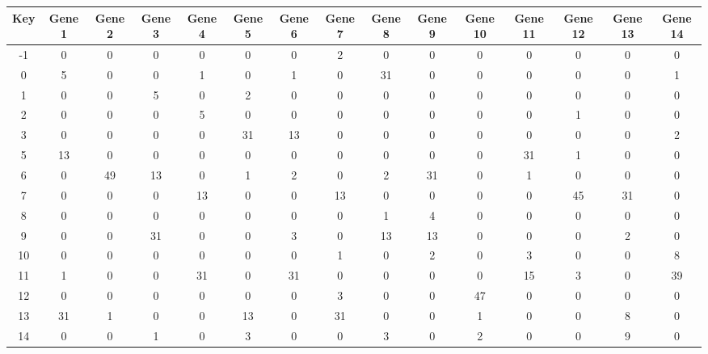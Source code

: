 \begin{tabular}{|c|c|c|c|c|c|c|c|c|c|c|c|c|c|c|}
\hline
Key & Gene 1 & Gene 2 & Gene 3 & Gene 4 & Gene 5 & Gene 6 & Gene 7 & Gene 8 & Gene 9 & Gene 10 & Gene 11 & Gene 12 & Gene 13 & Gene 14 \\
\hline
-1 & 0 & 0 & 0 & 0 & 0 & 0 & 2 & 0 & 0 & 0 & 0 & 0 & 0 & 0 \\
0 & 5 & 0 & 0 & 1 & 0 & 1 & 0 & 31 & 0 & 0 & 0 & 0 & 0 & 1 \\
1 & 0 & 0 & 5 & 0 & 2 & 0 & 0 & 0 & 0 & 0 & 0 & 0 & 0 & 0 \\
2 & 0 & 0 & 0 & 5 & 0 & 0 & 0 & 0 & 0 & 0 & 0 & 1 & 0 & 0 \\
3 & 0 & 0 & 0 & 0 & 31 & 13 & 0 & 0 & 0 & 0 & 0 & 0 & 0 & 2 \\
5 & 13 & 0 & 0 & 0 & 0 & 0 & 0 & 0 & 0 & 0 & 31 & 1 & 0 & 0 \\
6 & 0 & 49 & 13 & 0 & 1 & 2 & 0 & 2 & 31 & 0 & 1 & 0 & 0 & 0 \\
7 & 0 & 0 & 0 & 13 & 0 & 0 & 13 & 0 & 0 & 0 & 0 & 45 & 31 & 0 \\
8 & 0 & 0 & 0 & 0 & 0 & 0 & 0 & 1 & 4 & 0 & 0 & 0 & 0 & 0 \\
9 & 0 & 0 & 31 & 0 & 0 & 3 & 0 & 13 & 13 & 0 & 0 & 0 & 2 & 0 \\
10 & 0 & 0 & 0 & 0 & 0 & 0 & 1 & 0 & 2 & 0 & 3 & 0 & 0 & 8 \\
11 & 1 & 0 & 0 & 31 & 0 & 31 & 0 & 0 & 0 & 0 & 15 & 3 & 0 & 39 \\
12 & 0 & 0 & 0 & 0 & 0 & 0 & 3 & 0 & 0 & 47 & 0 & 0 & 0 & 0 \\
13 & 31 & 1 & 0 & 0 & 13 & 0 & 31 & 0 & 0 & 1 & 0 & 0 & 8 & 0 \\
14 & 0 & 0 & 1 & 0 & 3 & 0 & 0 & 3 & 0 & 2 & 0 & 0 & 9 & 0 \\
\hline
\end{tabular}